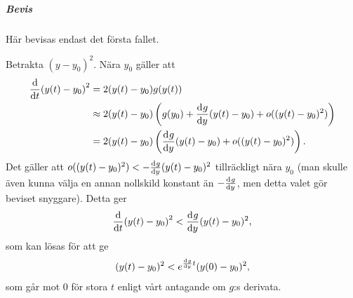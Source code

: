 \subparagraph{Bevis}
Här bevisas endast det första fallet.

Betrakta $(y - y_{0})^{2}$. Nära $y_{0}$ gäller att
\begin{align*}
	\dv{t}(y(t) - y_{0})^{2} &= 2(y(t) - y_{0})g(y(t)) \\
	                         &\approx 2(y(t) - y_{0})\left(g(y_{0}) + \dv[]{g}{y} (y_{0})(y(t) - y_{0}) + o((y(t) - y_{0})^{2})\right) \\
	                         &= 2(y(t) - y_{0})\left(\dv[]{g}{y} (y_{0})(y(t) - y_{0}) + o((y(t) - y_{0})^{2})\right).
\end{align*}
Det gäller att $o((y(t) - y_{0})^{2}) < -\dv[]{g}{y} (y_{0})(y(t) - y_{0})^{2}$ tillräckligt nära $y_{0}$ (man skulle även kunna välja en annan nollskild konstant än $-\dv[]{g}{y} (y_{0})$, men detta valet gör beviset snyggare). Detta ger
\begin{align*}
	\dv{t}(y(t) - y_{0})^{2} < \dv[]{g}{y} (y_{0})(y(t) - y_{0})^{2},
\end{align*}
som kan lösas för att ge
\begin{align*}
	(y(t) - y_{0})^{2} < e^{\dv[]{g}{y} (y_{0})t}(y(0) - y_{0})^{2},
\end{align*}
som går mot $0$ för stora $t$ enligt vårt antagande om $g$:s derivata.

